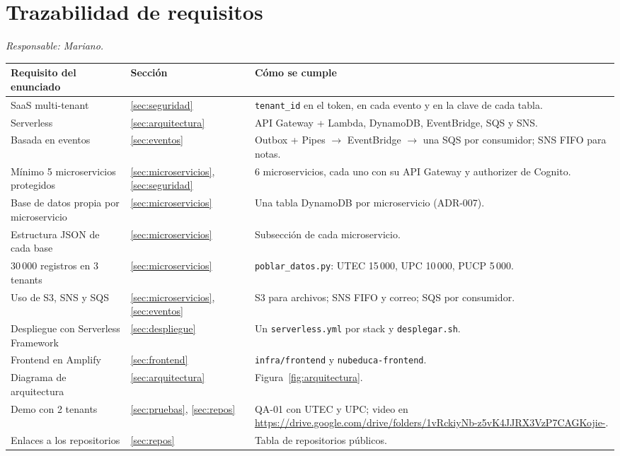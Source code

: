 \section{Trazabilidad de requisitos}
\label{sec:trazabilidad}
\textit{Responsable: Mariano.}

\begin{longtable}{p{}p{}p{}}
\toprule
Requisito del enunciado & Sección & Cómo se cumple \\
\midrule
\endhead
SaaS multi-tenant & \ref{sec:seguridad} & \texttt{tenant\_id} en el token, en cada evento y en la clave de cada tabla. \\
Serverless & \ref{sec:arquitectura} & API Gateway + Lambda, DynamoDB, EventBridge, SQS y SNS. \\
Basada en eventos & \ref{sec:eventos} & Outbox + Pipes $\rightarrow$ EventBridge $\rightarrow$ una SQS por consumidor; SNS FIFO para notas. \\
Mínimo 5 microservicios protegidos & \ref{sec:microservicios}, \ref{sec:seguridad} & 6 microservicios, cada uno con su API Gateway y authorizer de Cognito. \\
Base de datos propia por microservicio & \ref{sec:microservicios} & Una tabla DynamoDB por microservicio (ADR-007). \\
Estructura JSON de cada base & \ref{sec:microservicios} & Subsección de cada microservicio. \\
30\,000 registros en 3 tenants & \ref{sec:microservicios} & \texttt{poblar\_datos.py}: UTEC 15\,000, UPC 10\,000, PUCP 5\,000. \\
Uso de S3, SNS y SQS & \ref{sec:microservicios}, \ref{sec:eventos} & S3 para archivos; SNS FIFO y correo; SQS por consumidor. \\
Despliegue con Serverless Framework & \ref{sec:despliegue} & Un \texttt{serverless.yml} por stack y \texttt{desplegar.sh}. \\
Frontend en Amplify & \ref{sec:frontend} & \texttt{infra/frontend} y \texttt{nubeduca-frontend}. \\
Diagrama de arquitectura & \ref{sec:arquitectura} & Figura~\ref{fig:arquitectura}. \\
Demo con 2 tenants & \ref{sec:pruebas}, \ref{sec:repos} & QA-01 con UTEC y UPC; video en \url{https://drive.google.com/drive/folders/1vRckiyNb-z5vK4JJRX3VzP7CAGKojie-}. \\
Enlaces a los repositorios & \ref{sec:repos} & Tabla de repositorios públicos. \\
\bottomrule
\end{longtable}
